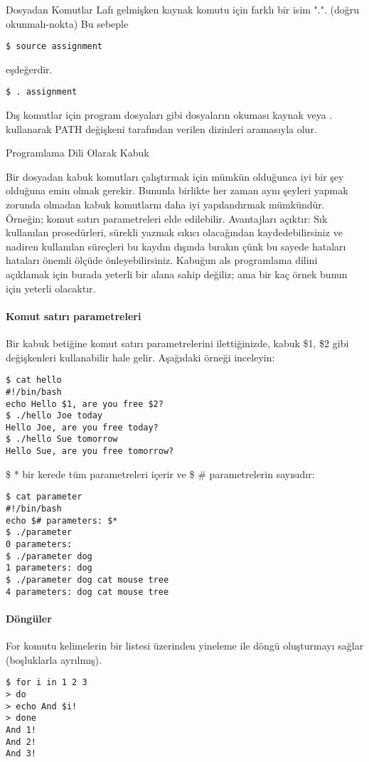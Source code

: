 \begin{section}{Dosyadan Komutlar}
Lafı gelmişken kaynak komutu için farklı bir isim ".". (doğru okunmalı-nokta) Bu sebeple
\begin{verbatim}
$ source assignment
\end{verbatim} 
eşdeğerdir.
\begin{verbatim}
$ . assignment
\end{verbatim}

Dış komutlar için program dosyaları gibi dosyaların okuması kaynak veya . kullanarak PATH değişkeni tarafından verilen dizinleri aramasıyla olur.
\end{section}
\begin{section}{Programlama Dili Olarak Kabuk}

Bir dosyadan kabuk komutları çalıştırmak için mümkün olduğunca iyi bir şey olduğuna emin olmak gerekir. Bununla birlikte her zaman aynı şeyleri yapmak zorunda olmadan kabuk komutlarnı daha iyi yapılandırmak mümkündür. Örneğin; komut satırı parametreleri elde edilebilir. Avantajları açıktır: Sık kullanılan prosedürleri, sürekli yazmak sıkıcı olacağından kaydedebilirsiniz ve nadiren kullanılan süreçleri bu kaydın dışında bırakın çünk bu sayede hataları hataları önemli ölçüde önleyebilirsiniz. Kabuğun als programlama dilini açıklamak için burada yeterli bir alana sahip değiliz; ama bir kaç örnek bunun için yeterli olacaktır.

\paragraph{Komut satırı parametreleri}{Bir kabuk betiğine komut satırı parametrelerini ilettiğinizde, kabuk \$1, \$2 gibi değişkenleri kullanabilir hale gelir. Aşağıdaki örneği inceleyin:
\begin{verbatim}
$ cat hello
#!/bin/bash
echo Hello $1, are you free $2?
$ ./hello Joe today
Hello Joe, are you free today?
$ ./hello Sue tomorrow
Hello Sue, are you free tomorrow?
\end{verbatim}
}

\$ * bir kerede tüm parametreleri içerir ve \$ \# parametrelerin sayısıdır:
\begin{verbatim}
$ cat parameter
#!/bin/bash
echo $# parameters: $*
$ ./parameter
0 parameters:
$ ./parameter dog
1 parameters: dog
$ ./parameter dog cat mouse tree
4 parameters: dog cat mouse tree
\end{verbatim}

\paragraph{Döngüler}{For komutu kelimelerin bir listesi üzerinden yineleme ile döngü oluşturmayı sağlar (boşluklarla ayrılmış).
\begin{verbatim}
$ for i in 1 2 3
> do
> echo And $i!
> done
And 1!
And 2!
And 3!
\end{verbatim}
}


\end{section}
